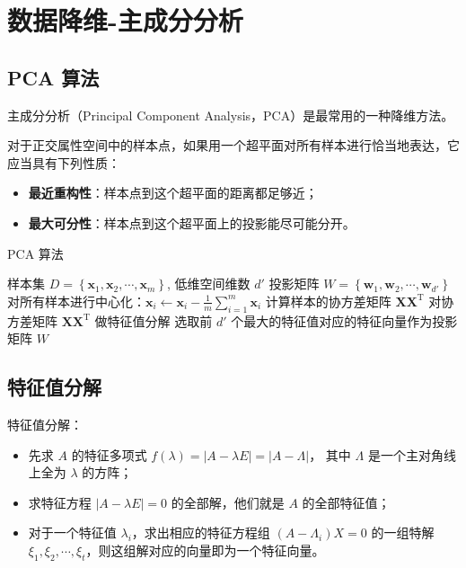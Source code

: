 \section{数据降维-主成分分析}
\subsection{PCA 算法}
主成分分析（Principal Component Analysis，PCA）是最常用的一种降维方法。

对于正交属性空间中的样本点，如果用一个超平面对所有样本进行恰当地表达，它应当具有下列性质：

\begin{itemize}
    \item \textbf{最近重构性}：样本点到这个超平面的距离都足够近；
    \item \textbf{最大可分性}：样本点到这个超平面上的投影能尽可能分开。
\end{itemize}

\begin{algorithm}[H]
    \renewcommand{\algorithmicrequire}{\textbf{Input:}}
	\renewcommand{\algorithmicensure}{\textbf{Output:}}
    \caption{PCA 算法}
    \begin{algorithmic}[1]
        \REQUIRE 样本集 $D = \left\{\boldsymbol{x}_1, \boldsymbol{x}_2, \cdots, \boldsymbol{x}_m\right\}$, 低维空间维数 $d'$
        \ENSURE 投影矩阵 $W = \left\{\boldsymbol{w}_1, \boldsymbol{w}_2, \cdots, \boldsymbol{w}_{d'}\right\}$
        \STATE 对所有样本进行中心化：$\boldsymbol{x}_i \leftarrow \boldsymbol{x}_i - \frac 1m \sum_{i=1}^m \boldsymbol{x}_i$
        \STATE 计算样本的协方差矩阵 $\mathbf{XX}^\mathrm T$
        \STATE 对协方差矩阵 $\mathbf{XX}^\mathrm T$ 做特征值分解
        \STATE 选取前 $d'$ 个最大的特征值对应的特征向量作为投影矩阵 $W$
    \end{algorithmic}
\end{algorithm}

\subsection{特征值分解}
特征值分解：

\begin{itemize}
    \item 先求 $A$ 的特征多项式 $f(\lambda) = |A - \lambda E| = |A - \Lambda|$，
    其中 $\Lambda$ 是一个主对角线上全为 $\lambda$ 的方阵；
    \item 求特征方程 $|A - \lambda E| = 0$ 的全部解，他们就是 $A$ 的全部特征值；
    \item  对于一个特征值 $\lambda_i$，求出相应的特征方程组 $(A - \Lambda_i)X = 0$ 的一组特解
     $\xi_1, \xi_2, \cdots, \xi_t$，则这组解对应的向量即为一个特征向量。
\end{itemize}

